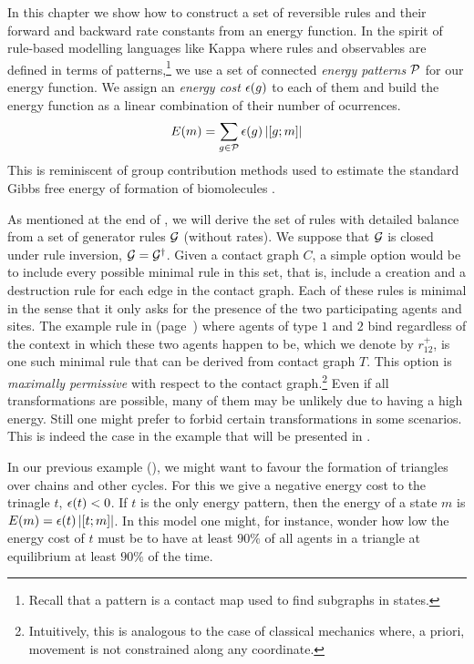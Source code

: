 In this chapter we show how to construct a set of reversible rules
and their forward and backward rate constants from an energy function.
In the spirit of rule-based modelling languages like Kappa
where rules and observables are defined in terms of patterns,\footnote{
  Recall that a pattern is a contact map used to find subgraphs in states.}
we use a set of connected \emph{energy patterns} $\mathcal{P}$
for our energy function.
We assign an \emph{energy cost} $\epsilon(g)$ to each of them
and build the energy function as a linear combination
of their number of ocurrences. %
\begin{equation}
  \label{eq:graph-energy}
  E(m) = \sum_{g \in \mathcal{P}} \epsilon(g) \left\lvert \left[g;m\right] \right\rvert
\end{equation}
This is reminiscent of group contribution methods
used to estimate the standard Gibbs free energy of formation
of biomolecules \citep{group-contrib}.

As mentioned at the end of ,
we will derive the set of rules with detailed balance
from a set of generator rules $\mathcal{G}$ (without rates).
We suppose that $\mathcal{G}$ is closed under
rule inversion, \ie $\mathcal{G} = \mathcal{G}^\dagger$.
Given a contact graph $C$,
a simple option would be to include
every possible minimal rule in this set,
that is, include a creation and a destruction rule
for each edge in the contact graph.
Each of these rules is minimal in the sense that
it only asks for the presence of
the two participating agents and sites.
The example rule in  (page~\pageref{p:example})
where agents of type $1$ and $2$ bind
regardless of the context
in which these two agents happen to be,
which we denote by $r^+_{12}$,
is one such minimal rule
that can be derived from contact graph $T$.
This option is \emph{maximally permissive}
with respect to the contact graph.\footnote{
  Intuitively, this is analogous to the case of classical mechanics
  where, a priori, movement is not constrained along any coordinate.}
Even if all transformations are possible,
many of them may be unlikely due to having a high energy.
Still one might prefer to forbid certain transformations
in some scenarios.
This is indeed the case in the example
that will be presented in .

In our previous example (),
we might want to favour the formation of
triangles over chains and other cycles.
For this we give a negative energy cost to the trinagle $t$,
\ie $\epsilon(t) < 0$.
If $t$ is the only energy pattern,
then the energy of a state $m$ is
$E(m) = \epsilon(t) \left\lvert \left[t;m\right] \right\rvert$.
In this model one might, for instance,
wonder how low the energy cost of $t$ must be
to have at least $90\%$ of all agents in a triangle
at equilibrium at least $90\%$ of the time.

